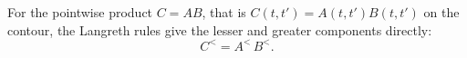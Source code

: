 \documentclass{article}
\begin{document}
For the pointwise product $C = AB$, that is $C(t,t') = A(t,t')B(t,t')$ on the contour,
the Langreth rules give the lesser and greater components directly:
\begin{equation}
C^{<} = A^{<}\,B^{<} .
\label{eq:pl}
\end{equation}
\end{document}
